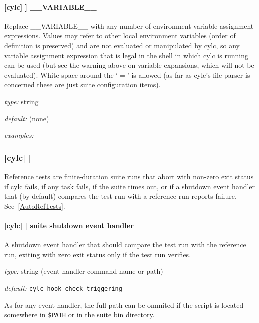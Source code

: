 \paragraph[\_\_VARIABLE\_\_ ]{[cylc] \textrightarrow [[environment]] \textrightarrow \_\_VARIABLE\_\_}

Replace \_\_VARIABLE\_\_ with any number of environment variable
assignment expressions.
Values may refer to other local environment variables (order of
definition is preserved) and are not evaluated or manipulated by
cylc, so any variable assignment expression that is legal in the
shell in which cylc is running can be used (but see the warning
above on variable expansions, which will not be evaluated).
White space around the `$=$' is allowed (as far as cylc's file
parser is concerned these are just suite configuration items).

\begin{myitemize}
    \item {\em type:} string
    \item {\em default:} (none)
    \item {\em examples:}
\end{myitemize}


\subsubsection[{[[}reference test{]]}]{[cylc] \textrightarrow [[reference test]] }
\label{ReferenceTestConfig}

Reference tests are finite-duration suite runs that abort with non-zero
exit status if cylc fails, if any task fails, if the suite times
out, or if a shutdown event handler that (by default) compares the test
run with a reference run reports failure. See~\ref{AutoRefTests}.

\paragraph[suite shutdown event handler]{[cylc] \textrightarrow [[reference test]] \textrightarrow suite shutdown event handler}

A shutdown event handler that should compare the test run with the
reference run, exiting with zero exit status only if the test run
verifies.

\begin{myitemize}
    \item {\em type:} string (event handler command name or path)
    \item {\em default:} \lstinline=cylc hook check-triggering=
\end{myitemize}
As for any event handler, the full path can be ommited if the script is
located somewhere in \lstinline=$PATH= or in the suite bin directory.

